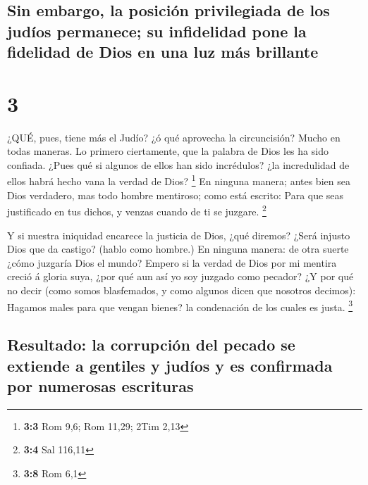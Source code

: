 \hypertarget{sin-embargo-la-posiciuxf3n-privilegiada-de-los-juduxedos-permanece-su-infidelidad-pone-la-fidelidad-de-dios-en-una-luz-muxe1s-brillante}{%
\subsection{Sin embargo, la posición privilegiada de los judíos
permanece; su infidelidad pone la fidelidad de Dios en una luz más
brillante}\label{sin-embargo-la-posiciuxf3n-privilegiada-de-los-juduxedos-permanece-su-infidelidad-pone-la-fidelidad-de-dios-en-una-luz-muxe1s-brillante}}

\hypertarget{section-2}{%
\section{3}\label{section-2}}

 ¿QUÉ, pues, tiene más el Judío? ¿ó qué aprovecha la
circuncisión?  Mucho en todas maneras. Lo primero
ciertamente, que la palabra de Dios les ha sido confiada. 
¿Pues qué si algunos de ellos han sido incrédulos? ¿la incredulidad de
ellos habrá hecho vana la verdad de Dios? \footnote{\textbf{3:3} Rom
  9,6; Rom 11,29; 2Tim 2,13}  En ninguna manera; antes bien
sea Dios verdadero, mas todo hombre mentiroso; como está escrito: Para
que seas justificado en tus dichos, y venzas cuando de ti se juzgare.
\footnote{\textbf{3:4} Sal 116,11}

 Y si nuestra iniquidad encarece la justicia de Dios, ¿qué
diremos? ¿Será injusto Dios que da castigo? (hablo como hombre.)
 En ninguna manera: de otra suerte ¿cómo juzgaría Dios el
mundo?  Empero si la verdad de Dios por mi mentira creció á
gloria suya, ¿por qué aun así yo soy juzgado como pecador? 
¿Y por qué no decir (como somos blasfemados, y como algunos dicen que
nosotros decimos): Hagamos males para que vengan bienes? la condenación
de los cuales es justa. \footnote{\textbf{3:8} Rom 6,1}

\hypertarget{resultado-la-corrupciuxf3n-del-pecado-se-extiende-a-gentiles-y-juduxedos-y-es-confirmada-por-numerosas-escrituras}{%
\subsection{Resultado: la corrupción del pecado se extiende a gentiles y
judíos y es confirmada por numerosas
escrituras}\label{resultado-la-corrupciuxf3n-del-pecado-se-extiende-a-gentiles-y-juduxedos-y-es-confirmada-por-numerosas-escrituras}}

